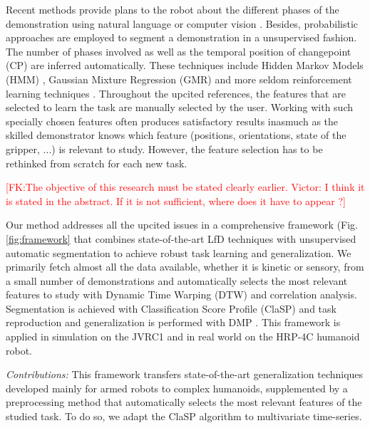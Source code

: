 \documentclass[conference]{IEEEtran}
\newcommand{\fk}[1]{\textcolor{red}{[FK:#1]}}
\begin{document}
Recent methods provide plans to the robot about the different phases of the demonstration using natural language or computer vision \cite{caccavale_kinesthetic_2019} \cite{saran_enhancing_2019}. Besides, probabilistic approaches are employed to segment a demonstration in a unsupervised fashion. The number of phases involved as well as the temporal position of changepoint (CP) are inferred automatically. These techniques include Hidden Markov Models (HMM) \cite{niekum_learning_2015}, Gaussian Mixture Regression (GMR) \cite{calinon_learning_2010} \cite{calinon_learning_2007} and more seldom reinforcement learning techniques \cite{kroemer_towards_2015}. Throughout the upcited references, the features that are selected to learn the task are manually selected by the user. Working with such specially chosen features often produces satisfactory results inasmuch as the skilled demonstrator knows which feature (positions, orientations, state of the gripper, ...) is relevant to study. However, the feature selection has to be rethinked from scratch for each new task. \newline

\fk{The objective of this research must be stated clearly earlier. \newline
Victor: I think it is stated in the abstract. If it is not sufficient, where does it have to appear ?}


Our method addresses all the upcited issues in a comprehensive framework (Fig. \ref{fig:framework} that combines state-of-the-art LfD techniques with unsupervised automatic segmentation to achieve robust task learning and generalization. We primarily fetch almost all the data available, whether it is kinetic  or sensory, from a small number of demonstrations and automatically selects the most relevant features to study with Dynamic Time Warping (DTW) \cite{dtw} and correlation analysis. Segmentation is achieved with Classification Score Profile (ClaSP) \cite{clasp} and task reproduction and generalization is performed with DMP \cite{ijspeert_movement_2002} \cite{ijspeert_dynamical_2013}. This framework is applied in simulation on the JVRC1 \cite{jvrc} and in real world on the HRP-4C \cite{hrp4} humanoid robot.

\textit{Contributions:} 
This framework transfers state-of-the-art generalization techniques developed mainly for armed robots to complex humanoids, supplemented by a preprocessing method that automatically selects the most relevant features of the studied task. To do so, we adapt the ClaSP \cite{Cl} algorithm to multivariate time-series.
\end{document}
